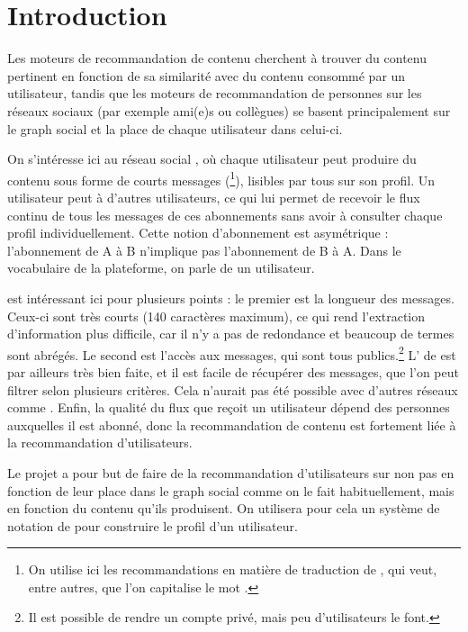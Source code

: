 
\section{Introduction}

Les moteurs de recommandation de contenu cherchent à trouver du contenu
pertinent en fonction de sa similarité avec du contenu consommé par un
utilisateur, tandis que les moteurs de recommandation de personnes sur les
réseaux sociaux (par exemple ami(e)s ou collègues) se basent principalement sur
le graph social et la place de chaque utilisateur dans celui-ci.

On s’intéresse ici au réseau social \twt{}, où chaque utilisateur peut produire
du contenu sous forme de courts messages (\tweets\footnote{On utilise ici les
  recommandations en matière de traduction de \twt{}, qui veut, entre autres,
  que l’on capitalise le mot \tweet{}.}), lisibles par tous sur son
profil. Un utilisateur peut  à d’autres utilisateurs, ce qui lui
permet de recevoir le flux continu de tous les messages de ces abonnements sans
avoir à consulter chaque profil individuellement. Cette notion d’abonnement est
asymétrique : l’abonnement de A à B n’implique pas l’abonnement de B à A. Dans
le vocabulaire de la plateforme, on parle de  un utilisateur.

\twt{} est intéressant ici pour plusieurs points : le premier est la longueur
des messages. Ceux-ci sont très courts (140 caractères maximum), ce qui rend
l’extraction d’information plus difficile, car il n’y a pas de redondance et
beaucoup de termes sont abrégés. Le second est l’accès aux messages, qui sont
tous publics.\footnote{Il est possible de rendre un compte privé, mais peu
d’utilisateurs le font.} L’\api{} de \twt{} est par ailleurs très bien faite,
et il est facile de récupérer des messages, que l’on peut filtrer selon
plusieurs critères. Cela n’aurait pas été possible avec d’autres réseaux comme
\fb{}. Enfin, la qualité du flux que reçoit un utilisateur dépend des personnes
auxquelles il est abonné, donc la recommandation de contenu est fortement liée
à la recommandation d’utilisateurs.

Le projet \tb{} a pour but de faire de la recommandation d’utilisateurs sur
\twt{} non pas en fonction de leur place dans le graph social comme on le fait
habituellement, mais en fonction du contenu qu’ils produisent. On utilisera
pour cela un système de notation de \tweets{} pour construire le profil d’un
utilisateur.

